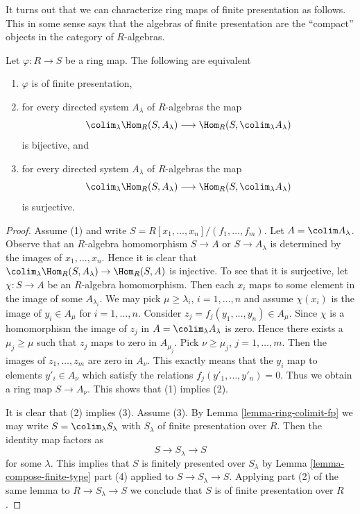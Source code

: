 \noindent
It turns out that we can characterize ring maps of finite
presentation as follows. This in some sense says that the
algebras of finite presentation are the ``compact'' objects
in the category of $R$-algebras.

\begin{lemma}
\label{lemma-characterize-finite-presentation}
Let $\varphi : R \to S$ be a ring map. The following are equivalent
\begin{enumerate}
\item $\varphi$ is of finite presentation,
\item for every directed system $A_\lambda$ of $R$-algebras
the map
$$
\colim_\lambda \Hom_R(S, A_\lambda) \longrightarrow
\Hom_R(S, \colim_\lambda A_\lambda)
$$
is bijective, and
\item for every directed system $A_\lambda$ of $R$-algebras
the map
$$
\colim_\lambda \Hom_R(S, A_\lambda) \longrightarrow
\Hom_R(S, \colim_\lambda A_\lambda)
$$
is surjective.
\end{enumerate}
\end{lemma}

\begin{proof}
Assume (1) and write $S = R[x_1, \ldots, x_n] / (f_1, \ldots, f_m)$.
Let $A = \colim A_\lambda$. Observe that an $R$-algebra homomorphism
$S \to A$ or $S \to A_\lambda$ is determined by the images of
$x_1, \ldots, x_n$. Hence it is clear that
$\colim_\lambda \Hom_R(S, A_\lambda) \to \Hom_R(S, A)$
is injective. To see that it is surjective, let $\chi : S \to A$
be an $R$-algebra homomorphism. Then each
$x_i$ maps to some element in the image of some $A_{\lambda_i}$.
We may pick $\mu \geq \lambda_i$, $i = 1, \ldots, n$ and
assume $\chi(x_i)$ is the image of $y_i \in A_\mu$ for
$i = 1, \ldots, n$. Consider $z_j = f_j(y_1, \ldots, y_n) \in A_\mu$.
Since $\chi$ is a homomorphism the image of $z_j$ in
$A = \colim_\lambda A_\lambda$ is zero. Hence there exists a
$\mu_j \geq \mu$ such that $z_j$ maps to zero in $A_{\mu_j}$.
Pick $\nu \geq \mu_j$, $j = 1, \ldots, m$. Then the
images of $z_1, \ldots, z_m$ are zero in $A_\nu$. This
exactly means that the $y_i$ map to elements
$y'_i \in A_\nu$ which satisfy the relations $f_j(y'_1, \ldots, y'_n) = 0$.
Thus we obtain a ring map $S \to A_\nu$. This shows that
(1) implies (2).

\medskip\noindent
It is clear that (2) implies (3). Assume (3).
By Lemma \ref{lemma-ring-colimit-fp} we may write
$S = \colim_\lambda S_\lambda$ with $S_\lambda$
of finite presentation over $R$. Then the identity map
factors as
$$
S \to S_\lambda \to S
$$
for some $\lambda$. This implies that $S$
is finitely presented over $S_\lambda$ by
Lemma \ref{lemma-compose-finite-type} part (4)
applied to $S \to S_\lambda \to S$. Applying part (2) of the same
lemma to $R \to S_\lambda \to S$ we conclude that $S$ is of finite
presentation over $R$.
\end{proof}

